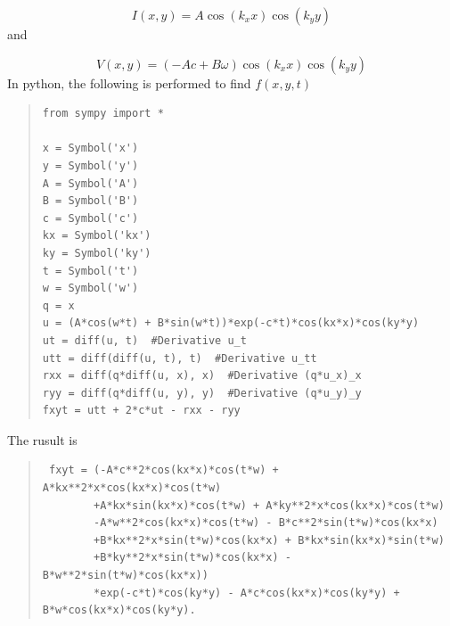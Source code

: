 \documentclass[twoside]{article}
\begin{document}
\begin{equation}
 I(x,y) = A \cos(k_x x)\cos(k_y y)
\end{equation}
and 

\begin{equation}
 V(x,y) = (-A c + B \omega)\cos(k_x x)\cos(k_y y) 
\end{equation}
In python, the following is performed to find $f(x, y, t)$

\begin{quote}
\begin{verbatim}
from sympy import *

x = Symbol('x')
y = Symbol('y')
A = Symbol('A')
B = Symbol('B')
c = Symbol('c')
kx = Symbol('kx')
ky = Symbol('ky')
t = Symbol('t')
w = Symbol('w')
q = x
u = (A*cos(w*t) + B*sin(w*t))*exp(-c*t)*cos(kx*x)*cos(ky*y)
ut = diff(u, t)  #Derivative u_t
utt = diff(diff(u, t), t)  #Derivative u_tt
rxx = diff(q*diff(u, x), x)  #Derivative (q*u_x)_x
ryy = diff(q*diff(u, y), y)  #Derivative (q*u_y)_y
fxyt = utt + 2*c*ut - rxx - ryy
\end{verbatim}
\end{quote}
The rusult is
\begin{quote}
\begin{verbatim}
 fxyt = (-A*c**2*cos(kx*x)*cos(t*w) + A*kx**2*x*cos(kx*x)*cos(t*w)
        +A*kx*sin(kx*x)*cos(t*w) + A*ky**2*x*cos(kx*x)*cos(t*w) 
        -A*w**2*cos(kx*x)*cos(t*w) - B*c**2*sin(t*w)*cos(kx*x) 
        +B*kx**2*x*sin(t*w)*cos(kx*x) + B*kx*sin(kx*x)*sin(t*w)
        +B*ky**2*x*sin(t*w)*cos(kx*x) - B*w**2*sin(t*w)*cos(kx*x))
        *exp(-c*t)*cos(ky*y) - A*c*cos(kx*x)*cos(ky*y) + B*w*cos(kx*x)*cos(ky*y).
\end{verbatim}
\end{quote}
\end{document}
